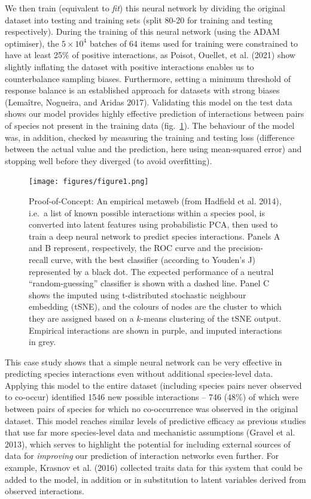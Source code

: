 \documentclass[10pt,oneside]{article}
\begin{document}
We then train (equivalent to \emph{fit}) this neural network by dividing
the original dataset into testing and training sets (split 80-20 for
training and testing respectively). During the training of this neural
network (using the ADAM optimiser), the \(5\times 10^4\) batches of 64
items used for training were constrained to have at least 25\% of
positive interactions, as Poisot, Ouellet, et al. (2021) show slightly
inflating the dataset with positive interactions enables us to
counterbalance sampling biases. Furthermore, setting a minimum threshold
of response balance is an established approach for datasets with strong
biases (Lemaître, Nogueira, and Aridas 2017). Validating this model on
the test data shows our model provides highly effective prediction of
interactions between pairs of species not present in the training data
(fig.~\ref{fig:example}). The behaviour of the model was, in addition,
checked by measuring the training and testing loss (difference between
the actual value and the prediction, here using mean-squared error) and
stopping well before they diverged (to avoid overfitting).

\begin{figure}
\hypertarget{fig:example}{%
\centering
\texttt{[image: figures/figure1.png]}
\caption{Proof-of-Concept: An empirical metaweb (from Hadfield et al.
2014), i.e.~a list of known possible interactions within a species pool,
is converted into latent features using probabilistic PCA, then used to
train a deep neural network to predict species interactions. Panels A
and B represent, respectively, the ROC curve and the precision-recall
curve, with the best classifier (according to Youden's J) represented by
a black dot. The expected performance of a neutral ``random-guessing''
classifier is shown with a dashed line. Panel C shows the imputed using
t-distributed stochastic neighbour embedding (tSNE), and the colours of
nodes are the cluster to which they are assigned based on a \(k\)-means
clustering of the tSNE output. Empirical interactions are shown in
purple, and imputed interactions in grey.}\label{fig:example}
}
\end{figure}

This case study shows that a simple neural network can be very effective
in predicting species interactions even without additional species-level
data. Applying this model to the entire dataset (including species pairs
never observed to co-occur) identified 1546 new possible interactions --
746 (48\%) of which were between pairs of species for which no
co-occurrence was observed in the original dataset. This model reaches
similar levels of predictive efficacy as previous studies that use far
more species-level data and mechanistic assumptions (Gravel et al.
2013), which serves to highlight the potential for including external
sources of data for \emph{improving} our prediction of interaction
networks even further. For example, Krasnov et al. (2016) collected
traits data for this system that could be added to the model, in
addition or in substitution to latent variables derived from observed
interactions.
\end{document}
